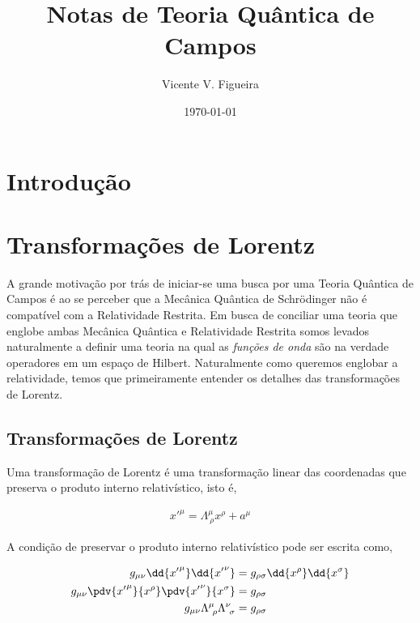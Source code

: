 \documentclass[twoside]{amsart}
\title{
Notas de Teoria Quântica de Campos
}
\author{
  Vicente V. Figueira
       }
\date{\today}
\numberwithin{equation}{section}
\begin{document}
\maketitle

\tableofcontents

\newpage

\section{Introdução}

\newpage

\section{Transformações de Lorentz}

A grande motivação por trás de iniciar-se uma busca por uma Teoria Quântica de Campos é ao se perceber que 
a Mecânica Quântica de Schrödinger não é compatível com a Relatividade Restrita. Em busca de conciliar uma 
teoria que englobe ambas Mecânica Quântica e Relatividade Restrita somos levados naturalmente a definir 
uma teoria na qual as \emph{funções de onda} são na verdade operadores em um espaço de Hilbert. Naturalmente 
como queremos englobar a relatividade, temos que primeiramente entender os detalhes das transformações de Lorentz.

\subsection{Transformações de Lorentz}

Uma transformação de Lorentz é uma transformação linear das coordenadas que preserva o produto interno relativístico, 
isto é, 

\begin{align*}
    {x'}^{\mu}=\Lambda^{\mu}_{\ \rho}x^\rho+a^\mu
\end{align*}

A condição de preservar o produto interno relativístico pode ser escrita como,

\begin{align*}
    g_{\mu\nu}\dd{{x'}^{\mu}}\dd{{x'}^{\nu}}&=g_{\rho\sigma}\dd{x^{\rho}}\dd{x^\sigma}\\
    g_{\mu\nu}\pdv{{x'}^\mu}{x^\rho}\pdv{{x'}^\nu}{x^\sigma}&=g_{\rho\sigma}\\
    g_{\mu\nu}\Lambda^{\mu}_{\ \rho}\Lambda^{\nu}_{\ \sigma}&=g_{\rho\sigma}
\end{align*}
\end{document}
